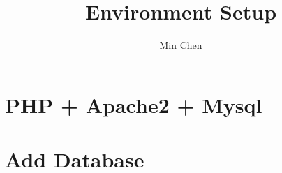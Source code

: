 \documentclass[UTF8]{article}
\title{Environment Setup}
\author{Min Chen}
\date{}
\begin{document}
\maketitle

\section{PHP + Apache2 + Mysql}

\section{Add Database}
\end{document}
